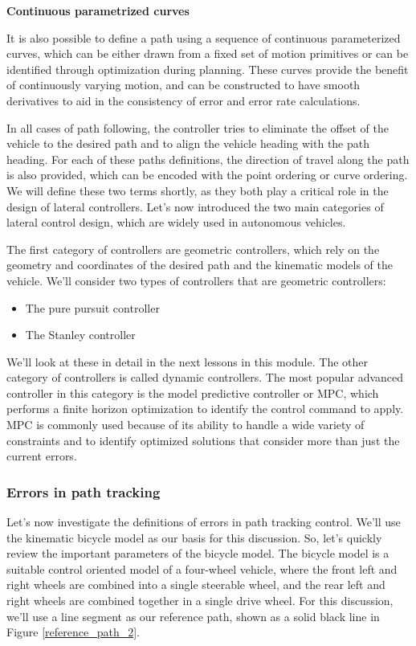 \textbf{Continuous parametrized curves}

It is also possible to define a path using a sequence of continuous
parameterized curves, which can be either drawn
from a fixed set of motion primitives or can be identified through
optimization during planning. These curves provide the benefit
of continuously varying motion, and can be constructed to have
smooth derivatives to aid in the consistency of error and
error rate calculations. 



In all cases of path following, the controller tries to eliminate
the offset of the vehicle to the desired path and to align the vehicle heading
with the path heading. For each of these paths definitions, the direction of travel along
the path is also provided, which can be encoded with the
point ordering or curve ordering. We will define
these two terms shortly, as they both play a critical role in the design of lateral controllers. Let's now introduced
the two main categories of lateral control design, which are widely used
in autonomous vehicles. 

The first category of controllers
are geometric controllers, which rely on the geometry
and coordinates of the desired path and the kinematic models of the vehicle. We'll consider two types
of controllers that are geometric controllers:

\begin{itemize}
\item The pure pursuit controller 
\item The Stanley controller
\end{itemize}

We'll look at these in detail in
the next lessons in this module. The other category of controllers
is called dynamic controllers. The most popular
advanced controller in this category is the model
predictive controller or MPC, which performs a finite
horizon optimization to identify the control
command to apply. MPC is commonly used because of its ability to handle
a wide variety of constraints and to identify optimized solutions that consider more than just the current errors. 


\subsubsection{Errors in path tracking}
\label{error_path_tracking}

 Let's now investigate the definitions of errors in path tracking control. We'll use the kinematic bicycle model as our basis for this discussion. So, let's quickly review the important parameters
of the bicycle model. The bicycle model is a suitable control oriented model of a four-wheel vehicle, where the front left
and right wheels are combined into a single steerable wheel, and the rear left and right wheels are combined together in
a single drive wheel. For this discussion, we'll use a line segment as our reference path, shown as a solid black line
in Figure \ref{reference_path_2}. 

